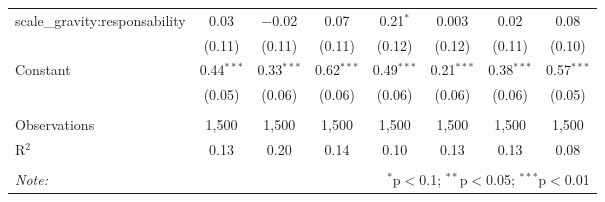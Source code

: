 \documentclass[
]{article}
\begin{document}
\begin{sidewaystable}[!htbp]
\begin{tabular}{@{\extracolsep{1pt}}lccccccc}
  scale\_gravity:responsability & 0.03 & $-$0.02 & 0.07 & 0.21$^{*}$ & 0.003 & 0.02 & 0.08 \\ 
  & (0.11) & (0.11) & (0.11) & (0.12) & (0.12) & (0.11) & (0.10) \\ 
  Constant & 0.44$^{***}$ & 0.33$^{***}$ & 0.62$^{***}$ & 0.49$^{***}$ & 0.21$^{***}$ & 0.38$^{***}$ & 0.57$^{***}$ \\ 
  & (0.05) & (0.06) & (0.06) & (0.06) & (0.06) & (0.06) & (0.05) \\ 
 \hline \\[-1.8ex] 
Observations & 1,500 & 1,500 & 1,500 & 1,500 & 1,500 & 1,500 & 1,500 \\ 
R$^{2}$ & 0.13 & 0.20 & 0.14 & 0.10 & 0.13 & 0.13 & 0.08 \\ 
\hline 
\hline \\[-1.8ex] 
\textit{Note:}  & \multicolumn{7}{r}{$^{*}$p$<$0.1; $^{**}$p$<$0.05; $^{***}$p$<$0.01} \\ 
\end{tabular} 
\end{sidewaystable}
\end{document}
